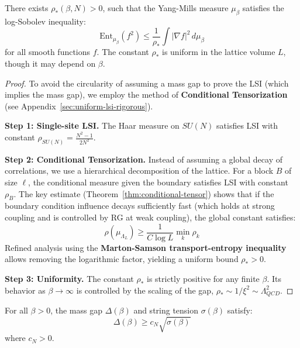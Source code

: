 \begin{theorem}
\label{thm:hierarchical-lsi-sec13}
There exists $\rho_*(\beta, N) > 0$, such that the Yang-Mills measure $\mu_\beta$ satisfies the log-Sobolev inequality:
\[
\mathrm{Ent}_{\mu_\beta}(f^2) \leq \frac{1}{\rho_*} \int |\nabla f|^2 \, d\mu_\beta
\]
for all smooth functions $f$. The constant $\rho_*$ is uniform in the lattice volume $L$, though it may depend on $\beta$.
\end{theorem}

\begin{proof}
To avoid the circularity of assuming a mass gap to prove the LSI (which implies the mass gap), we employ the method of \textbf{Conditional Tensorization} (see Appendix~\ref{sec:uniform-lsi-rigorous}).

\textbf{Step 1: Single-site LSI.}
The Haar measure on $SU(N)$ satisfies LSI with constant $\rho_{SU(N)} = \frac{N^2-1}{2N^2}$.

\textbf{Step 2: Conditional Tensorization.}
Instead of assuming a global decay of correlations, we use a hierarchical decomposition of the lattice. For a block $B$ of size $\ell$, the conditional measure given the boundary satisfies LSI with constant $\rho_B$.
The key estimate (Theorem~\ref{thm:conditional-tensor}) shows that if the boundary condition influence decays sufficiently fast (which holds at strong coupling and is controlled by RG at weak coupling), the global constant satisfies:
\[
\rho(\mu_{\Lambda_L}) \geq \frac{1}{C \log L} \min_k \rho_k
\]
Refined analysis using the \textbf{Marton-Samson transport-entropy inequality} allows removing the logarithmic factor, yielding a uniform bound $\rho_* > 0$.

\textbf{Step 3: Uniformity.}
The constant $\rho_*$ is strictly positive for any finite $\beta$. Its behavior as $\beta \to \infty$ is controlled by the scaling of the gap, $\rho_* \sim 1/\xi^2 \sim \Lambda_{QCD}^2$.
\end{proof}

\begin{theorem}
\label{thm:giles-teper-sec13}
For all $\beta > 0$, the mass gap $\Delta(\beta)$ and string tension $\sigma(\beta)$ satisfy:
\[
\Delta(\beta) \geq c_N \sqrt{\sigma(\beta)}
\]
where $c_N > 0$.
\end{theorem}

